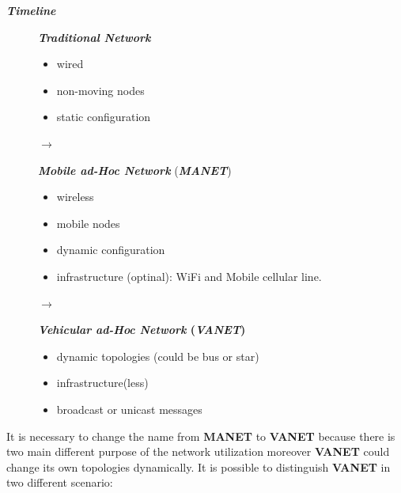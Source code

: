 \newpage
\textbf{\textit{Timeline}}

\begin{figure}[h]
    \centering
    \begin{minipage}[t]{0.2\textwidth}
        \centering
        \textbf{\textit{Traditional Network}}
        \begin{itemize}[nosep]
            \item wired
            \item non-moving nodes
            \item static configuration
        \end{itemize}
    \end{minipage}
    $\rightarrow$
    \begin{minipage}[t]{0.35\textwidth}
        \centering
        \textbf{\textit{Mobile ad-Hoc Network}} (\textbf{\textit{MANET}})
        \begin{itemize}[nosep]
            \item wireless
            \item mobile nodes
            \item dynamic configuration
            \item infrastructure (optinal): WiFi and Mobile cellular line.
        \end{itemize}
    \end{minipage}
    $\rightarrow$
    \begin{minipage}[t]{0.35\textwidth}
        \centering
        \textbf{\textit{Vehicular ad-Hoc Network} (\textbf{\textit{VANET}})}
        \begin{itemize}[nosep]
            \item dynamic topologies (could be bus or star)
            \item infrastructure(less)
            \item broadcast or unicast messages
        \end{itemize}
    \end{minipage}
\end{figure}
It is necessary to change the name from \textbf{MANET} to \textbf{VANET} because there is two main different purpose of the network utilization moreover \textbf{VANET} could change its own topologies dynamically.
It is possible to distinguish \textbf{VANET} in two different scenario:
